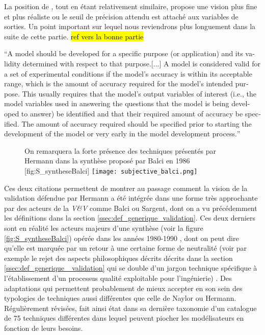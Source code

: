 La position de \textcite[166]{Sargent2010}, tout en étant relativement similaire, propose une vision plus fine et plus réaliste ou le seuil de précision attendu est attaché aux variables de sorties. Un point important sur lequel nous reviendrons plus longuement dans la suite de cette partie. \hl{ref vers la bonne partie}

\foreignquote{english}{A model should be developed for a specific purpose (or application) and its validity determined with respect to that purpose.[...] A model is considered valid for a set of experimental conditions if the model’s accuracy is within its acceptable range, which is the amount of accuracy required for the model’s intended purpose. This usually requires that the model’s output variables of interest (i.e., the model variables used in answering the questions that the model is being developed to answer) be identified and that their required amount of accuracy be specified. The amount of accuracy required should be specified prior to starting the development of the model or very early in the model development process.}\autocite[166]{Sargent2010}

\begin{figure}[h]
\begin{sidecaption}[fortoc]{ On remarquera la forte présence des techniques présentés par Hermann dans la synthèse proposé par Balci en 1986 \autocite{Balci1986}}[fig:S_syntheseBalci]
  \centering
 \texttt{[image: subjective\_balci.png]}
  \end{sidecaption}
\end{figure}

Ces deux citations permettent de montrer au passage comment la vision de la validation défendue par Hermann a été intégrée dans une forme très approchante par des acteurs de la \textit{V\&V} comme Balci ou Sargent, dont on a vu précédemment les définitions dans la section \ref{ssec:def_generique_validation}. Ces deux derniers sont en réalité les acteurs majeurs d'une synthèse (voir la figure \ref{fig:S_syntheseBalci}) opérée dans les années 1980-1990 \autocite{Nance2002}, dont on peut dire qu'elle est marquée par un retour à une certaine forme de neutralité (voir par exemple le rejet des aspects philosophiques décrits décrits dans la section \ref{ssec:def_generique_ validation}  qui se double d'un jargon technique spécifique à l'établissement d'un processus qualité exploitable pour l'ingénierie) . Des adaptations qui permettent probablement de mieux accepter en son sein des typologies de techniques aussi différentes que celle de Naylor ou Hermann. Régulièrement révisées, \textcite{Balci1998} fait ainsi état dans sa dernière taxonomie d'un catalogue de 75 techniques différentes dans lequel peuvent piocher les modélisateurs en fonction de leurs besoins. 


